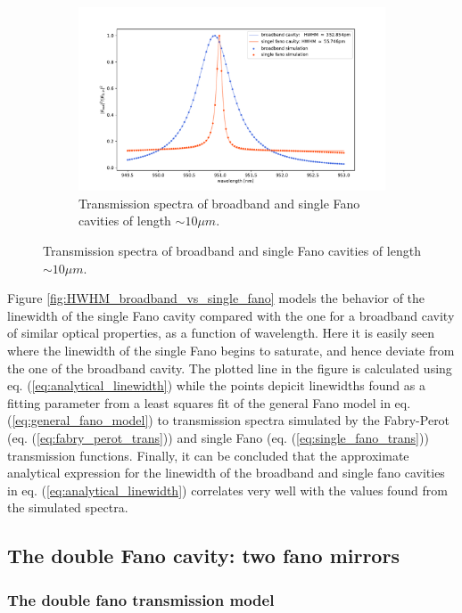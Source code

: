 \begin{figure}
\begin{subfigure}[c]{0.34\textwidth}
        \includegraphics[width=\textwidth]{figures/sim_single_vs_broadband_10um.pdf}
        \caption{Transmission spectra of broadband and single Fano cavities of length $\sim 10 \mu m$.}
        \label{fig:10um_broadband_and_single_fano_peak}
    \end{subfigure}
\end{figure}

Figure \ref{fig:HWHM_broadband_vs_single_fano} models the behavior of the linewidth of the single Fano cavity compared with the one for a broadband cavity of similar optical properties, as a function of wavelength. Here it is easily seen where the linewidth of the single Fano begins to saturate, and hence deviate from the one of the broadband cavity. The plotted line in the figure is calculated using eq. (\ref{eq:analytical_linewidth}) while the points depicit linewidths found as a fitting parameter from a least squares fit of the general Fano model in eq. (\ref{eq:general_fano_model}) to transmission spectra simulated by the Fabry-Perot (eq. (\ref{eq:fabry_perot_trans})) and single Fano (eq. (\ref{eq:single_fano_trans})) transmission functions. Finally, it can be concluded that the approximate analytical expression for the linewidth of the broadband and single fano cavities in eq. (\ref{eq:analytical_linewidth}) correlates very well with the values found from the simulated spectra.

\subsection{The double Fano cavity: two fano mirrors}

\subsubsection{The double fano transmission model}

